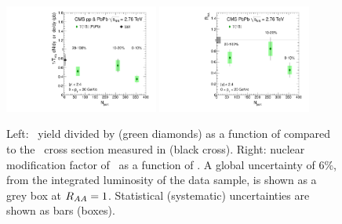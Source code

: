 \begin{figure}[htbp]
  \begin{center}
    \includegraphics[width=0.45\textwidth]{chap_YInPbPbColl2010_figures/upsilon_cent}\hspace{1em}
    \includegraphics[width=0.45\textwidth]{chap_YInPbPbColl2010_figures/upsilon_RAA.pdf}
    \caption{Left: \PgUa\ yield divided by \taa (green diamonds) as a
      function of \npart compared to the \PgUa\ cross section measured
      in \pp (black cross). Right: nuclear modification factor \raa of
      \PgUa\ as a function of \npart. A global uncertainty of 6\%, from
      the integrated luminosity of the \pp data sample, is shown as a
      grey box at $R_{AA}=1$. Statistical (systematic) uncertainties are
      shown as bars (boxes).}
    \label{fig:upsilon_cent}
  \end{center}
\end{figure}



